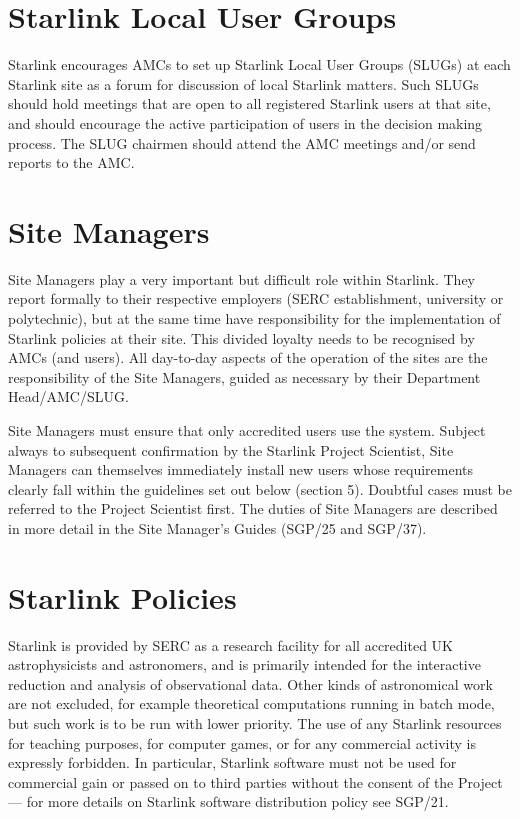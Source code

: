 \section{Starlink Local User Groups}

Starlink encourages AMCs to set up Starlink Local User Groups (SLUGs) at each
Starlink site as a forum for discussion of local Starlink matters.
Such SLUGs should hold meetings that are open to all registered Starlink users
at that site, and should encourage the active participation of users in the
decision making process.
The SLUG chairmen should attend the AMC meetings and/or send reports to the AMC.

\section {Site Managers}

Site Managers play a very important but difficult role within Starlink.
They report formally to their respective employers (SERC establishment,
university or polytechnic), but at the same time have responsibility for the
implementation of Starlink policies at their site.
This divided loyalty needs to be recognised by AMCs (and users).
All day-to-day aspects of the operation of the sites are the responsibility of
the Site Managers, guided as necessary by their Department Head/AMC/SLUG.

Site Managers must ensure that only accredited users use the system.
Subject always to subsequent confirmation by the Starlink Project Scientist,
Site Managers can themselves immediately install new users whose requirements
clearly fall within the guidelines set out below (section 5).
Doubtful cases must be referred to the Project Scientist first.
The duties of Site Managers are described in more detail in the Site
Manager's Guides (SGP/25 and SGP/37).

\section {Starlink Policies}

Starlink is provided by SERC as a research facility for all accredited UK
astrophysicists and astronomers, and is primarily intended for the interactive
reduction and analysis of observational data.
Other kinds of astronomical work are not excluded, for example theoretical
computations running in batch mode, but such work is to be run with lower
priority.
The use of any Starlink resources for teaching purposes, for computer games, or
for any commercial activity is expressly forbidden.
In particular, Starlink software must not be used for commercial gain or passed
on to third parties without the consent of the Project --- for more details
on Starlink software distribution policy see SGP/21.

